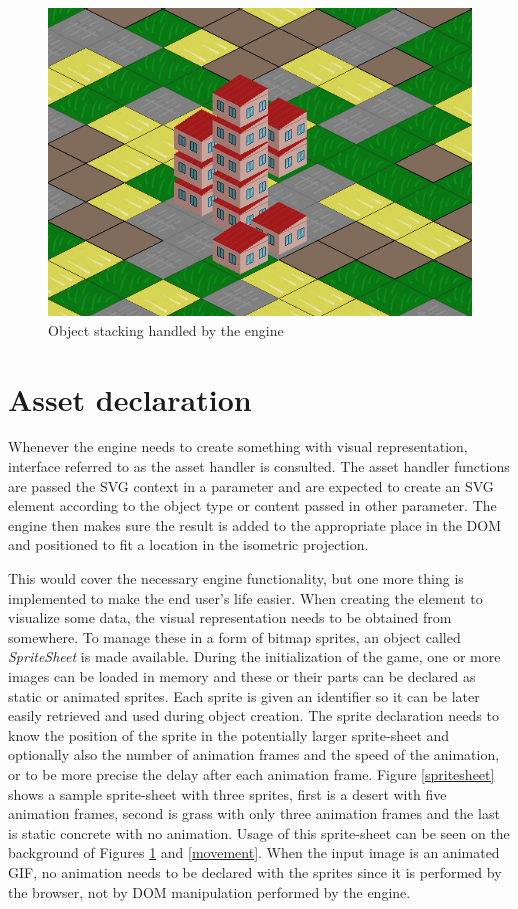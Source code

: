 \documentclass[11pt,oneside, final]{fithesis2}
\begin{document}
\begin{figure}[h]
	\centering
	\includegraphics[width=\textwidth]{thesis-stacking}
	\caption{Object stacking handled by the engine}
	\label{stacking}
\end{figure}

\section{Asset declaration}
Whenever the engine needs to create something with visual representation, interface referred to as the asset handler is consulted. The asset handler functions are passed the SVG context in a parameter and are expected to create an SVG element according to the object type or content passed in other parameter. The engine then makes sure the result is added to the appropriate place in the DOM and positioned to fit a location in the isometric projection.

This would cover the necessary engine functionality, but one more thing is implemented to make the end user's life easier. When creating the element to visualize some data, the visual representation needs to be obtained from somewhere. To manage these in a form of bitmap sprites, an object called \emph{SpriteSheet} is made available. During the initialization of the game, one or more images can be loaded in memory and these or their parts can be declared as static or animated sprites. Each sprite is given an identifier so it can be later easily retrieved and used during object creation. The sprite declaration needs to know the position of the sprite in the potentially larger sprite-sheet and optionally also the number of animation frames and the speed of the animation, or to be more precise the delay after each animation frame. Figure \ref{spritesheet} shows a sample sprite-sheet with three sprites, first is a desert with five animation frames, second is grass with only three animation frames and the last is static concrete with no animation. Usage of this sprite-sheet can be seen on the background of Figures \ref{stacking} and \ref{movement}. When the input image is an animated GIF, no animation needs to be declared with the sprites since it is performed by the browser, not by DOM manipulation performed by the engine.
\end{document}
